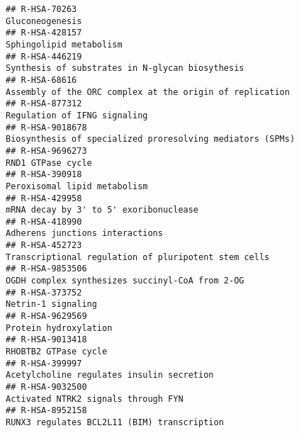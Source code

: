 \documentclass[
]{article}
\begin{document}
\begin{verbatim}
## R-HSA-70263                                                                                                                        Gluconeogenesis
## R-HSA-428157                                                                                                               Sphingolipid metabolism
## R-HSA-446219                                                                                       Synthesis of substrates in N-glycan biosythesis
## R-HSA-68616                                                                               Assembly of the ORC complex at the origin of replication
## R-HSA-877312                                                                                                          Regulation of IFNG signaling
## R-HSA-9018678                                                                            Biosynthesis of specialized proresolving mediators (SPMs)
## R-HSA-9696273                                                                                                                    RND1 GTPase cycle
## R-HSA-390918                                                                                                          Peroxisomal lipid metabolism
## R-HSA-429958                                                                                                mRNA decay by 3' to 5' exoribonuclease
## R-HSA-418990                                                                                                       Adherens junctions interactions
## R-HSA-452723                                                                                  Transcriptional regulation of pluripotent stem cells
## R-HSA-9853506                                                                                      OGDH complex synthesizes succinyl-CoA from 2-OG
## R-HSA-373752                                                                                                                    Netrin-1 signaling
## R-HSA-9629569                                                                                                                Protein hydroxylation
## R-HSA-9013418                                                                                                                 RHOBTB2 GTPase cycle
## R-HSA-399997                                                                                             Acetylcholine regulates insulin secretion
## R-HSA-9032500                                                                                                  Activated NTRK2 signals through FYN
## R-HSA-8952158                                                                                          RUNX3 regulates BCL2L11 (BIM) transcription

\end{verbatim}
\end{document}
